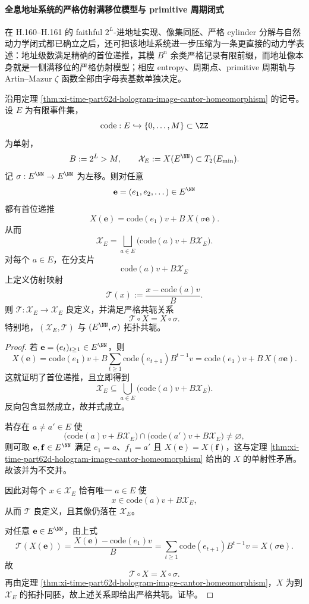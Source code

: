 \paragraph{全息地址系统的严格仿射满移位模型与 primitive 周期闭式}
在 H.160--H.161 的 faithful \(2^L\)-进地址实现、像集同胚、严格 cylinder 分解与自然动力学闭式都已确立之后，还可把该地址系统进一步压缩为一条更直接的动力学表述：地址级数满足精确的首位递推，其模 \(B^n\) 余类严格记录有限前缀，而地址像本身就是一侧满移位的严格仿射模型；相应 entropy、周期点、primitive 周期轨与 Artin--Mazur \(\zeta\) 函数全部由字母表基数单独决定。

\begin{theorem}\label{thm:xi-time-part62deb-hologram-affine-fullshift-conjugacy}
沿用定理 \ref{thm:xi-time-part62d-hologram-image-cantor-homeomorphism} 的记号。设 \(E\) 为有限事件集，
\[
\mathrm{code}:E\hookrightarrow \{0,\dots,M\}\subset \ZZ
\]
为单射，
\[
B:=2^L>M,
\qquad
\mathcal X_E:=X(E^{\NN})\subset T_2(E_{\min}).
\]
记 \(\sigma:E^{\NN}\to E^{\NN}\) 为左移。则对任意
\[
\mathbf e=(e_1,e_2,\dots)\in E^{\NN}
\]
都有首位递推
\[
X(\mathbf e)=\mathrm{code}(e_1)v+B\,X(\sigma\mathbf e).
\]
从而
\[
\mathcal X_E
=
\bigsqcup_{a\in E}\bigl(\mathrm{code}(a)v+B\mathcal X_E\bigr).
\]
对每个 \(a\in E\)，在分支片
\[
\mathrm{code}(a)v+B\mathcal X_E
\]
上定义仿射映射
\[
\mathcal T(x):=\frac{x-\mathrm{code}(a)v}{B}.
\]
则 \(\mathcal T:\mathcal X_E\to \mathcal X_E\) 良定义，并满足严格共轭关系
\[
\mathcal T\circ X=X\circ \sigma.
\]
特别地，\((\mathcal X_E,\mathcal T)\) 与 \((E^{\NN},\sigma)\) 拓扑共轭。
\end{theorem}
\begin{proof}
若 \(\mathbf e=(e_t)_{t\ge 1}\in E^{\NN}\)，则
\[
X(\mathbf e)
=
\mathrm{code}(e_1)v
+B\sum_{t\ge 1}\mathrm{code}(e_{t+1})B^{t-1}v
=
\mathrm{code}(e_1)v+B\,X(\sigma\mathbf e).
\]
这就证明了首位递推，且立即得到
\[
\mathcal X_E\subseteq \bigcup_{a\in E}\bigl(\mathrm{code}(a)v+B\mathcal X_E\bigr).
\]
反向包含显然成立，故并式成立。

若存在 \(a\neq a'\in E\) 使
\[
\bigl(\mathrm{code}(a)v+B\mathcal X_E\bigr)\cap
\bigl(\mathrm{code}(a')v+B\mathcal X_E\bigr)\neq\varnothing,
\]
则可取 \(\mathbf e,\mathbf f\in E^{\NN}\) 满足 \(e_1=a\)、\(f_1=a'\) 且 \(X(\mathbf e)=X(\mathbf f)\)，这与定理 \ref{thm:xi-time-part62d-hologram-image-cantor-homeomorphism} 给出的 \(X\) 的单射性矛盾。故该并为不交并。

因此对每个 \(x\in \mathcal X_E\) 恰有唯一 \(a\in E\) 使
\[
x\in \mathrm{code}(a)v+B\mathcal X_E,
\]
从而 \(\mathcal T\) 良定义，且其像仍落在 \(\mathcal X_E\)。

对任意 \(\mathbf e\in E^{\NN}\)，由上式
\[
\mathcal T(X(\mathbf e))
=
\frac{X(\mathbf e)-\mathrm{code}(e_1)v}{B}
=
\sum_{t\ge 1}\mathrm{code}(e_{t+1})B^{t-1}v
=
X(\sigma\mathbf e).
\]
故
\[
\mathcal T\circ X=X\circ \sigma.
\]
再由定理 \ref{thm:xi-time-part62d-hologram-image-cantor-homeomorphism}，\(X\) 为到 \(\mathcal X_E\) 的拓扑同胚，故上述关系即给出严格共轭。证毕。
\end{proof}

